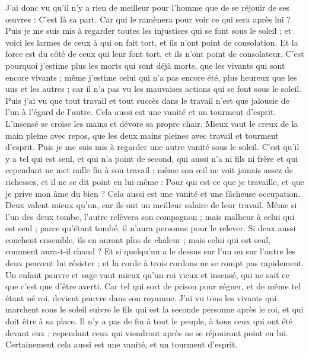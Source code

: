 \begin{multicols}{2}
J'ai donc vu qu'il n'y a rien de meilleur pour l'homme que de se réjouir de ses œuvres : C'est là sa part. Car qui le ramènera pour voir ce qui sera après lui ?
\VerseOne{}Puis je me suis mis à regarder toutes les injustices qui se font sous le soleil ; et voici les larmes de ceux à qui on fait tort, et ils n'ont point de consolation. Et la force est du côté de ceux qui leur font tort, et ils n'ont point de consolateur. 
C'est pourquoi j'estime plus les morts qui sont déjà morts, que les vivants qui sont encore vivants ;
même j'estime celui qui n'a pas encore été, plus heureux que les uns et les autres ; car il n'a pas vu les mauvaises actions qui se font sous le soleil.
Puis j'ai vu que tout travail et tout succès dans le travail n'est que jalousie de l'un à l'égard de l'autre. Cela aussi est une vanité et un tourment d'esprit. 
L'insensé se croise les mains et dévore sa propre chair.
Mieux vaut le creux de la main pleine avec repos, que les deux mains pleines avec travail et tourment d'esprit. 
Puis je me suis mis à regarder une autre vanité sous le soleil. 
C'est qu'il y a tel qui est seul, et qui n'a point de second, qui aussi n'a ni fils ni frère et qui cependant ne met nulle fin à son travail ; même son œil ne voit jamais assez de richesses, et il ne se dit point en lui-même : Pour qui est-ce que je travaille, et que je prive mon âme du bien ? Cela aussi est une vanité et une fâcheuse  occupation.
Deux valent mieux qu'un, car ils ont un meilleur salaire de leur travail.
Même si l'un des deux tombe, l'autre relèvera son compagnon ; mais malheur à celui qui est seul ; parce qu'étant tombé, il n'aura personne pour le relever. 
Si deux aussi couchent ensemble, ils en auront plus de chaleur ; mais celui qui est seul, comment aura-t-il chaud ? 
Et si quelqu'un a le dessus sur l'un ou sur l'autre les deux peuvent lui résister ; et la corde à trois cordons ne se rompt pas rapidement.
Un enfant pauvre et sage vaut mieux qu'un roi vieux et insensé, qui ne sait ce que c'est que d'être averti.
Car tel qui sort de prison pour régner, et de même tel étant né roi, devient pauvre dans son royaume.
J'ai vu tous les vivants qui marchent sous le soleil suivre le fils qui est la seconde personne après le roi, et qui doit être à sa place. 
Il n'y a pas de fin à tout le peuple, à tous ceux qui ont été devant eux ; cependant ceux qui viendront après ne se réjouiront point en lui. Certainement cela aussi est une vanité, et un tourment d'esprit. 

\end{multicols}
